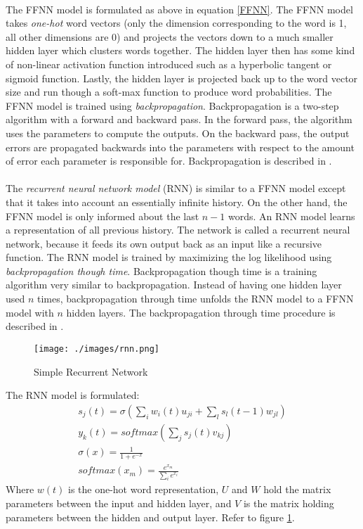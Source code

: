 \paragraph{}
The FFNN model is formulated as above in equation \ref{FFNN}. The FFNN model takes \emph{one-hot} word vectors (only the dimension corresponding to the word is 1, all other dimensions are 0) and projects the vectors down to a much smaller hidden layer which clusters words together. The hidden layer then has some kind of non-linear activation function introduced such as a hyperbolic tangent or sigmoid function. Lastly, the hidden layer is projected back up to the word vector size and run though a soft-max function to produce word probabilities. The FFNN model is trained using \emph{backpropagation}. Backpropagation is a two-step algorithm with a forward and backward pass. In the forward pass, the algorithm uses the parameters to compute the outputs. On the backward pass, the output errors are propagated backwards into the parameters with respect to the amount of error each parameter is responsible for. Backpropagation is described in \cite{Bengio2003}.

\paragraph{}
The \emph{recurrent neural network model} (RNN) is similar to a FFNN model except that it takes into account an essentially infinite history. On the other hand, the FFNN model is only informed about the last $n-1$ words. An RNN model learns a representation of all previous history. The network is called a recurrent neural network, because it feeds its own output back as an input like a recursive function. The RNN model is trained by maximizing the log likelihood using \emph{backpropagation though time}. Backpropagation though time is a training algorithm very similar to backpropagation. Instead of having one hidden layer used $n$ times, backpropagation through time unfolds the RNN model to a FFNN model with $n$ hidden layers. The backpropagation through time procedure is described in \cite{Mikolov2012}.

\begin{figure}
\centering
\texttt{[image: ./images/rnn.png]}
\caption{Simple Recurrent Network \cite[pg. 34]{Mikolov2012}}
\label{fig:RNNfigure}
\end{figure}

The RNN model is formulated:
\begin{align}
s_j(t) = \sigma \left( \sum_i w_i(t) u_{ji} + \sum_l s_l (t-1) w_{jl} \right)
\\y_k(t) = softmax \left( \sum_j s_j(t) v_{kj} \right)
\\ \sigma(x) = \frac{1}{1+e^{-x}}
\\ softmax(x_m) = \frac{e^{x_m} }{ \sum_i e^{x_i} } 
\end{align}
Where $w(t)$ is the one-hot word representation, $U$ and $W$ hold the matrix parameters between the input and hidden layer, and $V$ is the matrix holding parameters between the hidden and output layer. Refer to figure \ref{fig:RNNfigure}.

